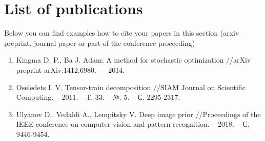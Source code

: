 \chapter{List of publications}
Below you can find examples how to cite your papers in this section (arxiv preprint, journal paper or part of the conference proceeding)

\begin{enumerate}
    \item Kingma D. P., Ba J. Adam: A method for stochastic optimization //arXiv preprint arXiv:1412.6980. --- 2014.
    \item  Oseledets I. V. Tensor-train decomposition //SIAM Journal on Scientific Computing. – 2011. – Т. 33. – №. 5. – С. 2295-2317.
    \item  Ulyanov D., Vedaldi A., Lempitsky V. Deep image prior //Proceedings of the IEEE conference on computer vision and pattern recognition. – 2018. – С. 9446-9454.
\end{enumerate}